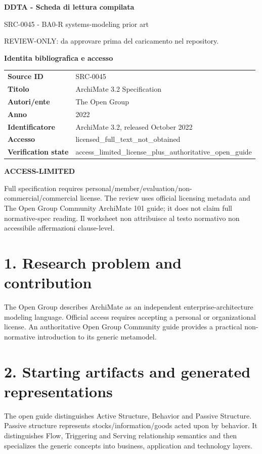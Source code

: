 \documentclass[10pt,a4paper]{article}
\newenvironment{factbox}[1]{\def\FrameCommand{\fcolorbox{ddtablue}{ddtagray}}\MakeFramed{\advance\hsize-2\width\FrameRestore}\noindent\textbf{#1}\par\smallskip}{\endMakeFramed}
\newenvironment{challenge}[1]{\def\FrameCommand{\fcolorbox{ddtaorange}{ddtagray}}\MakeFramed{\advance\hsize-2\width\FrameRestore}\noindent\textbf{#1}\par\smallskip}{\endMakeFramed}
\begin{document}
\begin{center}
{\LARGE\bfseries DDTA - Scheda di lettura compilata}\par
{\large SRC-0045 - BA0-R systems-modeling prior art}\par
{\small REVIEW-ONLY: da approvare prima del caricamento nel repository.}\par
\end{center}
\begin{factbox}{Identita bibliografica e accesso}
\begin{tabularx}{\linewidth}{>{\bfseries}p{3.4cm}X}
Source ID & SRC-0045\\
Titolo & ArchiMate 3.2 Specification\\
Autori/ente & The Open Group\\
Anno & 2022\\
Identificatore & ArchiMate 3.2, released October 2022\\
Accesso & licensed\_full\_text\_not\_obtained\\
Verification state & access\_limited\_license\_plus\_authoritative\_open\_guide\\
\end{tabularx}
\end{factbox}
\begin{challenge}{ACCESS-LIMITED}
Full specification requires personal/member/evaluation/non-commercial/commercial license. The review uses official licensing metadata and The Open Group Community ArchiMate 101 guide; it does not claim full normative-spec reading. Il worksheet non attribuisce al testo normativo non accessibile affermazioni clause-level.
\end{challenge}
\section{1. Research problem and contribution}
The Open Group describes ArchiMate as an independent enterprise-architecture modeling language. Official access requires accepting a personal or organizational license. An authoritative Open Group Community guide provides a practical non-normative introduction to its generic metamodel.
\section{2. Starting artifacts and generated representations}
The open guide distinguishes Active Structure, Behavior and Passive Structure. Passive structure represents stocks/information/goods acted upon by behavior. It distinguishes Flow, Triggering and Serving relationship semantics and then specializes the generic concepts into business, application and technology layers.
\end{document}
